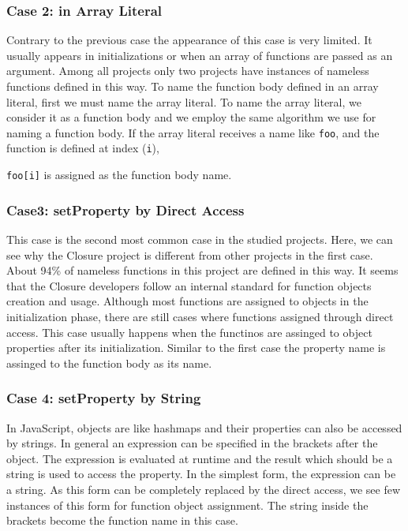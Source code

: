 \documentclass[10pt, preprint]{sigplanconf}
\begin{document}
\subsubsection{Case 2: in Array Literal}
Contrary to the previous case the appearance of this case is very limited. It usually appears in initializations or when an array of functions are passed as an argument. Among all projects only two projects have instances of nameless functions defined in this way. To name the function body defined in an array literal, first we must name the array literal. To name the array literal, we consider it as a function body and we employ the same algorithm we use for naming a function body. If the array literal receives a name like {\small\texttt{foo}}, and the function is defined at index ({\small\texttt{i}}), {{\small\texttt{foo[i]}} is assigned as the function body name. 


\subsubsection{Case3: setProperty by Direct Access }
This case is the second most common case in the studied projects. Here, we can see why the Closure project is different from other projects in the first case. About 94\% of nameless functions in this project are defined in this way. It seems that the Closure developers follow an internal standard for function objects creation and usage. Although most functions are assigned to objects in the initialization phase, there are still cases where functions assigned through direct access. 
This case usually happens when the functinos are assinged to object properties after its initialization. Similar to the first case the property name is assinged to the function body as its name. 
 

\subsubsection{Case 4: setProperty by String}
In JavaScript, objects are like hashmaps and their properties can also be accessed by strings. In general an expression can be specified in the brackets after the object. The expression is evaluated at runtime and the result which should be a string is used to access the property. In the simplest form, the expression can be a string. As this form can be completely replaced by the direct access, we see few instances of this form for function object assignment. The string inside the brackets become the function name in this case.

}
\end{document}
